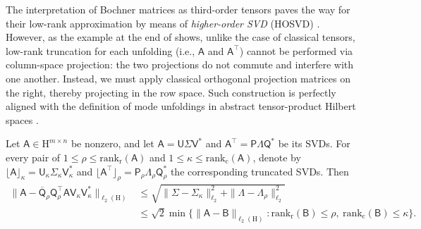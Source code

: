 \documentclass[onefignum,onetabnum]{siamart250211}
\newcommand{\Hilb}{\mathrm{H}}
\newcommand{\set}[3][]{#1\{ #2 : #3 #1\}}
\newcommand{\Batrix}[1]{\bm{\Matrix{#1}}}
\newcommand{\Matrix}[1]{\mathsf{#1}}
\newcommand{\trans}{\intercal}
\newcommand{\Rank}[3][]{\mathrm{rank_{#2}} #1( #3 #1)}
\newcommand{\truncate}[3][]{#1\lfloor #2 #1\rfloor_{#3}}
\newcommand{\Norm}[3][]{#1\| #2 #1\|_{\mathrm{#3}}}
\begin{document}
The interpretation of Bochner matrices as third-order tensors paves the way for their low-rank approximation by means of \emph{higher-order SVD} (HOSVD) \cite{de2000multilinear}.
However, as the example at the end of  shows, unlike the case of classical tensors, low-rank truncation for each unfolding (i.e., $\Batrix{A}$ and $\Batrix{A}^\trans$) cannot be performed via column-space projection: the two projections do not commute and interfere with one another.
Instead, we must apply classical orthogonal projection matrices on the right, thereby projecting in the row space.
Such construction is perfectly aligned with the definition of mode unfoldings in abstract tensor-product Hilbert spaces \cite{hackbusch2019tensor}.

\begin{theorem}
\label{theorem:hosvd}
Let $\Batrix{A} \in \Hilb^{m \times n}$ be nonzero, and let $\Batrix{A} = \Batrix{U} \Matrix{\Sigma} \Matrix{V}^\ast$ and $\Batrix{A}^\trans = \Batrix{P} \Matrix{\Lambda} \Matrix{Q}^\ast$ be its SVDs.
For every pair of $1 \leq \rho \leq \Rank{r}{\Batrix{A}}$ and $1 \leq \kappa \leq \Rank{c}{\Batrix{A}}$, denote by $\truncate{\Batrix{A}}{\kappa} = \Batrix{U}_{\kappa} \Matrix{\Sigma}_{\kappa} \Matrix{V}_{\kappa}^\ast$ and $\truncate{\Batrix{A}^\trans}{\rho} = \Batrix{P}_{\rho} \Matrix{\Lambda}_{\rho} \Matrix{Q}_{\rho}^\ast$ the corresponding truncated SVDs.
Then
\begin{align*}
    \Norm{\Batrix{A} - \overline{\Matrix{Q}}_\rho \Matrix{Q}_\rho^\trans \Batrix{A} \Matrix{V}_\kappa \Matrix{V}_\kappa^\ast}{\ell_2(\Hilb)} &\leq \sqrt{\Norm{\Matrix{\Sigma} - \Matrix{\Sigma}_\kappa}{\ell_2}^2 + \Norm{\Matrix{\Lambda} - \Matrix{\Lambda}_\rho}{\ell_2}^2} \\
    &\leq \sqrt{2} \min \set[\Big]{\Norm{\Batrix{A} - \Batrix{B}}{\ell_2(\Hilb)}}{\Rank{r}{\Batrix{B}} \leq \rho,~\Rank{c}{\Batrix{B}} \leq \kappa}.
\end{align*}
\end{theorem}
\end{document}
